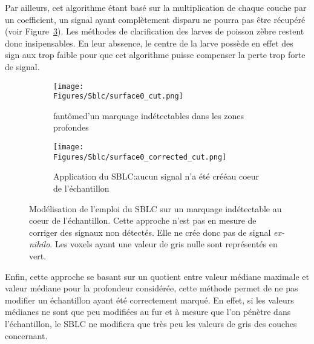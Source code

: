 \documentclass[\main/main.tex]{subfiles}
\begin{document}
%
Par ailleurs, cet algorithme étant basé sur la multiplication de chaque couche par
un coefficient, un signal ayant complètement disparu ne pourra pas être récupéré (voir Figure~\ref{fig:sblc:defaut:surface0}). Les méthodes de clarification des larves de poisson zèbre restent donc insipensables. En leur abssence, le centre de la larve possède en effet des sign	aux trop faible pour que cet algorithme puisse compenser la perte trop forte de signal.
%
\begin{figure}
    \centering
    \begin{subfigure}[b]{0.45\textwidth}
        
        \caption{fantôme\newline d'un marquage indétectables dans les zones profondes}
        \centering \texttt{[image: \\Figures/Sblc/surface0\_cut.png]}
        \label{fig:sblc:defaut:surface0:application}
    \end{subfigure}
    \begin{subfigure}[b]{0.45\textwidth} 
        \caption{Application du SBLC:\newline aucun signal n'a été créé\newline au coeur de l'échantillon}
        \centering \texttt{[image: \\Figures/Sblc/surface0\_corrected\_cut.png]}
        \label{fig:sblc:defaut:surface0:application}
    \end{subfigure}
    \caption{
        Modélisation de l'emploi du SBLC sur un marquage indétectable au coeur de l'échantillon.
        \newline
        Cette approche n'est pas en mesure de corriger des signaux non détectés.
        Elle ne crée donc pas de signal \emph{ex\hyp{}nihilo}.
        \newline
        Les voxels ayant une valeur de gris nulle sont représentés en vert.
        }
    \label{fig:sblc:defaut:surface0}
\end{figure}

%
Enfin, cette approche se basant sur un quotient entre valeur médiane maximale et valeur médiane pour la profondeur considérée, cette méthode permet de ne pas modifier un échantillon ayant été correctement marqué.
%
En effet, si les valeurs médianes ne sont que peu modifiées au fur et à mesure que l'on pénètre dans l'échantillon, le SBLC ne modifiera que très peu les valeurs de gris des couches concernant.
\end{document}
